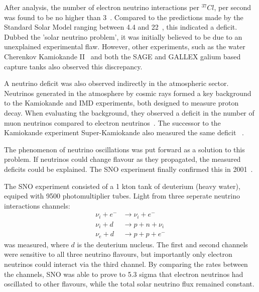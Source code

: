After analysis, the number of electron neutrino interactions per ${}^{37}Cl$, per second was found
to be no higher than 3~\cite{davis1968}. Compared to the predictions made by the Standard Solar
Model ranging between 4.4 and 22~\cite{bahcall1968}, this indicated a deficit. Dubbed the
'solar neutrino problem', it was initially believed to be due to an unexplained experimental flaw.
However, other experiments, such as the water Cherenkov Kamiokande II~\cite{hirata1989} and both
the SAGE and GALLEX galium based capture tanks also observed this discrepancy.

A neutrino deficit was also observed indirectly in the atmospheric sector. Neutrinos generated in
the atmosphere by cosmic rays formed a key background to the Kamiokande and IMD experiments, both
designed to measure proton decay. When evaluating the background, they observed a deficit in the
number of muon neutrinos compared to electron neutrinos~\cite{hirata1988, becker1992}. The
successor to the Kamiokande experiment Super-Kamiokande also measured the same deficit
~\cite{kajita1999}.

The phenomenon of neutrino oscillations was put forward as a solution to this problem. If
neutrinos could change flavour as they propagated, the measured deficits could be explained. The
SNO experiment finally confirmed this in 2001~\cite{ahmad2002}.

The SNO experiment consisted of a 1 kton tank of deuterium (heavy water), equiped with 9500
photomultiplier tubes. Light from three seperate neutrino interactions channels:
\begin{align} %
    \nu_{i}+e^{-} & \rightarrow \nu_{i}+e^{-} \\
    \nu_{i}+d     & \rightarrow p+n+\nu_{i}   \\
    \nu_{e}+d     & \rightarrow p+p+e^{-}
\end{align} %
was measured, where $d$ is the deuterium nucleus. The first and second channels were sensitive to
all three neutrino flavours, but importantly only electron neutrinos could interact via the third
channel. By comparing the rates between the channels, SNO was able to prove to 5.3 sigma that
electron neutrinos had oscillated to other flavours, while the total solar neutrino flux remained
constant.

